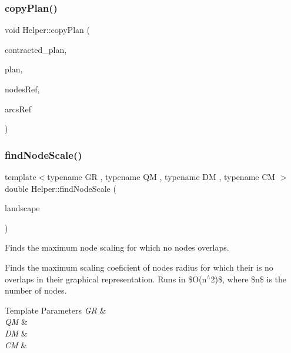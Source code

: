 \mbox{\label{namespace_helper_a2e40eca9f4613caf5319d76356fc6b44}} 
\subsubsection{\texorpdfstring{copy\+Plan()}{copyPlan()}}
{\footnotesize\ttfamily void Helper\+::copy\+Plan (\begin{DoxyParamCaption}\item[{\hyperlink{class_restoration_plan}{Restoration\+Plan} \&}]{contracted\+\_\+plan,  }\item[{const \hyperlink{class_restoration_plan}{Restoration\+Plan} \&}]{plan,  }\item[{const Graph\+\_\+t\+::\+Node\+Map$<$ Graph\+\_\+t\+::\+Node $>$ \&}]{nodes\+Ref,  }\item[{const Graph\+\_\+t\+::\+Arc\+Map$<$ Graph\+\_\+t\+::\+Arc $>$ \&}]{arcs\+Ref }\end{DoxyParamCaption})}

\mbox{\label{namespace_helper_ac8afc6aaaf4247e34fdc83469b06af6e}} 
\subsubsection{\texorpdfstring{find\+Node\+Scale()}{findNodeScale()}}
{\footnotesize\ttfamily template$<$typename GR , typename QM , typename DM , typename CM $>$ \\
double Helper\+::find\+Node\+Scale (\begin{DoxyParamCaption}\item[{const \hyperlink{classconcepts_1_1_abstract_landscape}{concepts\+::\+Abstract\+Landscape}$<$ GR, QM, DM, CM $>$ \&}]{landscape }\end{DoxyParamCaption})}



Finds the maximum node scaling for which no nodes overlaps. 

Finds the maximum scaling coeficient of nodes radius for which their is no overlaps in their graphical representation. Runs in \$\+O(n$^\wedge$2)\$, where \$n\$ is the number of nodes.


\begin{DoxyTemplParams}{Template Parameters}
{\em GR} & \\
\hline
{\em QM} & \\
\hline
{\em DM} & \\
\hline
{\em CM} & \\
\hline
\end{DoxyTemplParams}

